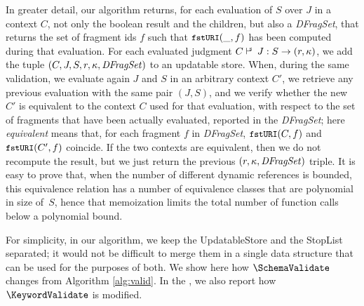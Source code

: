 In greater detail, our algorithm returns, for each evaluation of $S$ over $J$ in a context $C$, not only the boolean result
and the {\evaluated} children, but also a \emph{DFragSet}, that returns the set of fragment ids
$f$ such that $\mbox{\tt{\small fstURI}}(\_,f)$ has been computed during that evaluation.
For each evaluated judgment $\SJudgCJ{S} \Ret{} (r,\pk)$,
we add the tuple $(C,J,S,r,\kappa,\mathit{DFragSet})$ to an updatable store.
When, during the same validation, we evaluate again $J$ and $S$ in an arbitrary context $C'$, we retrieve any previous evaluation with the same pair
$(J,S)$, and we verify whether the new $C'$ is equivalent to the context $C$ used for that evaluation, with respect to the
set of fragments that have been actually evaluated, reported in the \emph{DFragSet}; here \emph{equivalent}
means that, for each fragment $f$ in \emph{DFragSet}, $\mbox{\tt{\small fstURI}}(C,f)$ and $\mbox{\tt{\small fstURI}}(C',f)$ coincide.
If the two contexts are equivalent, then we do not recompute the result, but we just return the previous $(r,\kappa,\mathit{DFragSet})$ triple.
%
It is easy to prove that,
when the number of different dynamic references is bounded, this equivalence relation has a number of equivalence
classes that are polynomial in size of~$S$, hence that memoization limits the total number of
function calls below a polynomial bound.%

For simplicity, in our algorithm, we keep the UpdatableStore and the StopList separated; it would not be difficult to
merge them in a single data structure that can be used for the purposes of both.
We show here how $\SchemaValidate$ changes from Algorithm \ref{alg:valid}.
In the {\FV}, we also report how $\KeywordValidate$ is modified.

